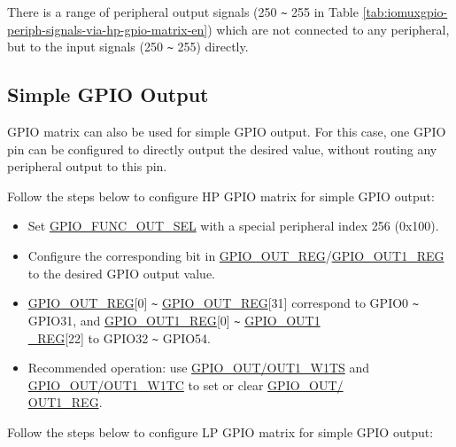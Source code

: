 \documentclass[main\_\_EN.tex]{subfiles}
\begin{document}
\begin{tiplisting}
There is a range of peripheral output signals (250 \verb+~+ 255 in Table \ref{tab:iomuxgpio-periph-signals-via-hp-gpio-matrix-en}) which are not connected to any peripheral, but to the input signals (250 \verb+~+ 255) directly.
\end{tiplisting}
\vspace{-2em}


\subsection{Simple GPIO Output}

GPIO matrix can also be used for simple GPIO output. For this case, one GPIO pin can be configured to directly output the desired value, without routing any peripheral output to this pin.

Follow the steps below to configure HP GPIO matrix for simple GPIO output:

\begin{itemize}
    \item Set \hyperref[fielddesc:GPIOFUNCNOUTSEL]{GPIO\_FUNC\_OUT\_SEL} with a special peripheral index 256 (0x100).
    \item Configure the corresponding bit in \hyperref[regdesc:GPIOOUTREG]{GPIO\_OUT\_REG}/\hyperref[regdesc:GPIOOUT1REG]{GPIO\_OUT1\_REG} to the desired GPIO output value.
\end{itemize}

\begin{tiplisting}
\vspace{-2em}
\begin{itemize}
\item \hyperref[regdesc:GPIOOUTREG]{GPIO\_OUT\_REG}[0] \verb+~+ \hyperref[regdesc:GPIOOUTREG]{GPIO\_OUT\_REG}[31] correspond to GPIO0 \verb+~+ GPIO31, and \hyperref[regdesc:GPIOOUT1REG]{GPIO\_OUT1\_REG}[0] \verb+~+ \hyperref[regdesc:GPIOOUT1REG]{GPIO\_OUT1\\\_REG}[22] to GPIO32 \verb+~+ GPIO54.
\item Recommended operation: use \hyperref[fielddesc:GPIOOUTW1TS]{GPIO\_OUT/OUT1\_W1TS} and \hyperref[fielddesc:GPIOOUTW1TC]{GPIO\_OUT/OUT1\_W1TC} to set or clear \hyperref[regdesc:GPIOOUTREG]{GPIO\_OUT/\\OUT1\_REG}.
\end{itemize}
\end{tiplisting}
Follow the steps below to configure LP GPIO matrix for simple GPIO output:
\end{document}
